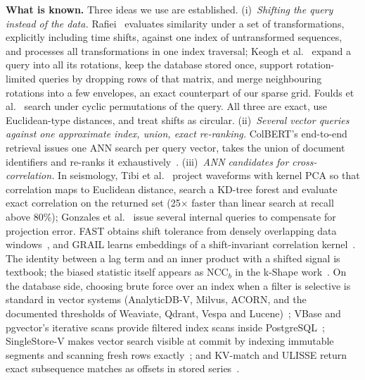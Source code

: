 \documentclass[sigconf]{acmart}
\begin{document}
\textbf{What is known.} Three ideas we use are established. (i)~\emph{Shifting the query instead of the data.} Rafiei~\cite{rafiei} evaluates similarity under a set of transformations, explicitly including time shifts, against one index of untransformed sequences, and processes all transformations in one index traversal; Keogh et al.~\cite{keogh} expand a query into all its rotations, keep the database stored once, support rotation-limited queries by dropping rows of that matrix, and merge neighbouring rotations into a few envelopes, an exact counterpart of our sparse grid. Foulds et al.~\cite{foulds} search under cyclic permutations of the query. All three are exact, use Euclidean-type distances, and treat shifts as circular. (ii)~\emph{Several vector queries against one approximate index, union, exact re-ranking.} ColBERT's end-to-end retrieval issues one ANN search per query vector, takes the union of document identifiers and re-ranks it exhaustively~\cite{colbert}. (iii)~\emph{ANN candidates for cross-correlation.} In seismology, Tibi et al.~\cite{tibi} project waveforms with kernel PCA so that correlation maps to Euclidean distance, search a KD-tree forest and evaluate exact correlation on the returned set (25$\times$ faster than linear search at recall above 80\%); Gonzales et al.~\cite{gonzales} issue several internal queries to compensate for projection error. FAST obtains shift tolerance from densely overlapping data windows~\cite{fast,rong}, and GRAIL learns embeddings of a shift-invariant correlation kernel~\cite{grail}. The identity between a lag term and an inner product with a shifted signal is textbook; the biased statistic itself appears as NCC$_b$ in the k-Shape work~\cite{kshapetods}. On the database side, choosing brute force over an index when a filter is selective is standard in vector systems (AnalyticDB-V, Milvus, ACORN, and the documented thresholds of Weaviate, Qdrant, Vespa and Lucene)~\cite{adbv,milvus,acorn}; VBase and pgvector's iterative scans provide filtered index scans inside PostgreSQL~\cite{vbase,pgvector}; SingleStore-V makes vector search visible at commit by indexing immutable segments and scanning fresh rows exactly~\cite{singlestorev}; and KV-match and ULISSE return exact subsequence matches as offsets in stored series~\cite{kvmatch,ulisse}.
\end{document}

